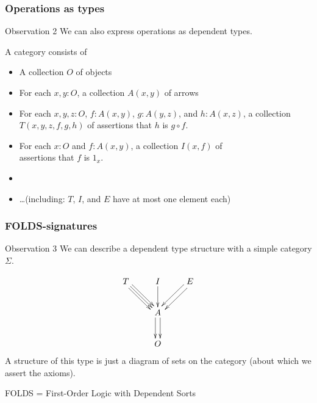\documentclass{beamer}
\begin{document}
\begin{frame}[t]
  \frametitle{Operations as types}
  \begin{block}{Observation 2}
    We can also express \alert<1>{operations} as dependent types.
  \end{block}
  A category consists of
  \begin{itemize}
  \item A collection $O$ of objects
  \item For each $x,y:O$, a collection $A(x,y)$ of arrows
  \item For each $x,y,z:O$, $f:A(x,y)$, $g:A(y,z)$, and $h:A(x,z)$, a collection $T(x,y,z,f,g,h)$ of \alert<1>{assertions that $h$ is $g\circ f$}.
  \item For each $x:O$ and $f:A(x,y)$, a collection $I(x,f)$ of \\\alert<1>{assertions that $f$ is $1_x$}.
  \item {}
    \pause
  \item \dots \pause (including: $T$, $I$, and $E$ have \alert<3>{at most one element each})
  \end{itemize}
\end{frame}

\begin{frame}
  \frametitle{FOLDS-signatures}
  \begin{block}{Observation 3}
    We can describe a dependent type structure with a \alert{simple category} $\Sigma$.
  \end{block}
  \[
  \vcenter{\xymatrix{
      T \ar[dr] \ar@<1mm>[dr] \ar@<-1mm>[dr] & I \ar[d] & E \ar@<1mm>[dl] \ar@<-1mm>[dl] \\
      & A \ar@<1mm>[d] \ar@<-1mm>[d] \\
      & O}}
  \]
  A structure of this type is just a diagram of sets on the category (about which we assert the axioms).

  \medskip
  \alert{FOLDS} = \alert{F}irst-\alert{O}rder \alert{L}ogic with \alert{D}ependent \alert{S}orts
\end{frame}
\end{document}

